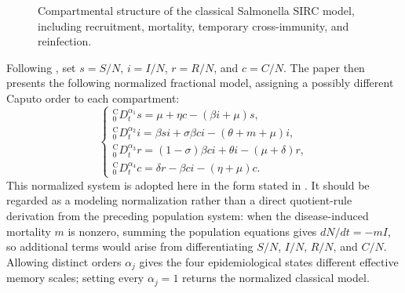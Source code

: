 \documentclass[00-main.tex]{subfiles}
\begin{document}
\begin{figure}[htbp]
\centering
{}
\caption{Compartmental structure of the classical Salmonella SIRC model, including recruitment, mortality, temporary cross-immunity, and reinfection.}
\label{fig:salmonella-sirc}
\end{figure}

Following \cite{Rihan14}, set $s=S/N$, $i=I/N$, $r=R/N$, and $c=C/N$. The paper then presents the following normalized fractional model, assigning a possibly different Caputo order to each compartment:
\[
\begin{cases}
 {}_{0}^{\mathrm C}\!D_t^{\alpha_1}s=\mu+\eta c-(\beta i+\mu)s,\\[3pt]
 {}_{0}^{\mathrm C}\!D_t^{\alpha_2}i=\beta si+\sigma\beta ci-(\theta+m+\mu)i,\\[3pt]
 {}_{0}^{\mathrm C}\!D_t^{\alpha_3}r=(1-\sigma)\beta ci+\theta i-(\mu+\delta)r,\\[3pt]
 {}_{0}^{\mathrm C}\!D_t^{\alpha_4}c=\delta r-\beta ci-(\eta+\mu)c.
\end{cases}
\]
This normalized system is adopted here in the form stated in \cite{Rihan14}. It should be regarded as a modeling normalization rather than a direct quotient-rule derivation from the preceding population system: when the disease-induced mortality $m$ is nonzero, summing the population equations gives $dN/dt=-mI$, so additional terms would arise from differentiating $S/N$, $I/N$, $R/N$, and $C/N$.
Allowing distinct orders $\alpha_j$ gives the four epidemiological states different effective memory scales; setting every $\alpha_j=1$ returns the normalized classical model.
\end{document}
